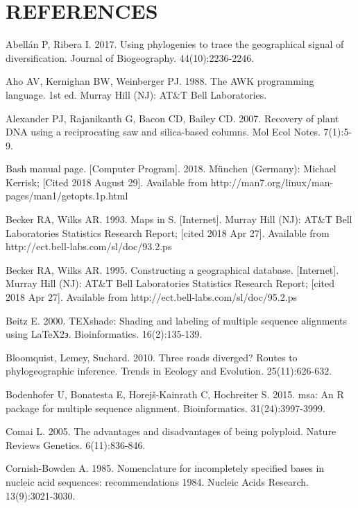 \chapter*{REFERENCES}
\vspace*{-12pt}

\setlength{\parindent}{-4em}
\setlength{\leftskip}{4em}
\setlength{\parskip}{12pt}
\singlespacing

\hspace*{-4em}

Abellán P, Ribera I. 2017. Using phylogenies to trace the geographical signal of diversification. Journal of Biogeography. 44(10):2236-2246.

Aho AV, Kernighan BW, Weinberger PJ. 1988. The AWK programming language. 1st ed. Murray Hill (NJ): AT\&T Bell Laboratories.

Alexander PJ, Rajanikanth G, Bacon CD, Bailey CD. 2007. Recovery of plant DNA using a reciprocating saw and silica-based columns. Mol Ecol Notes. 7(1):5-9.

Bash manual page. [Computer Program]. 2018. München (Germany): Michael Kerrisk; [Cited 2018 August 29].  Available from http://man7.org/linux/man-pages/man1/getopts.1p.html

Becker RA, Wilks AR. 1993. Maps in S. [Internet]. Murray Hill (NJ): AT\&T Bell Laboratories Statistics Research Report; [cited 2018 Apr 27]. Available from http://ect.bell-labs.com/sl/doc/93.2.ps

Becker RA, Wilks AR. 1995. Constructing a geographical database. [Internet]. Murray Hill (NJ): AT\&T Bell Laboratories Statistics Research Report; [cited 2018 Apr 27]. Available from http://ect.bell-labs.com/sl/doc/95.2.ps

Beitz E. 2000. TEXshade: Shading and labeling of multiple sequence alignments using \LaTeX 2$\backepsilon$. Bioinformatics. 16(2):135-139.

Bloomquist, Lemey, Suchard. 2010. Three roads diverged? Routes to phylogeographic inference. Trends in Ecology and Evolution. 25(11):626-632.

Bodenhofer U, Bonatesta E, Horej\v{s}-Kainrath C, Hochreiter S. 2015. msa: An R package for multiple sequence alignment. Bioinformatics. 31(24):3997-3999.

Comai L. 2005. The advantages and disadvantages of being polyploid. Nature Reviews Genetics. 6(11):836-846.

Cornish-Bowden A. 1985. Nomenclature for incompletely specified bases in nucleic acid sequences: recommendations 1984.  Nucleic Acids Research. 13(9):3021-3030.

